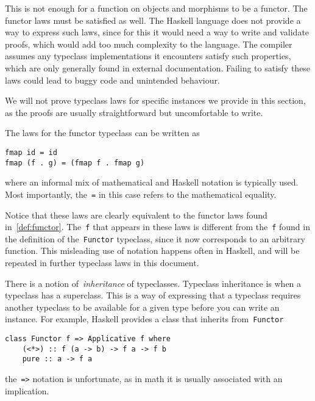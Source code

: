 \documentclass[../TFG.tex]{subfiles}
\begin{document}
This is not enough for a function on objects and morphisms to be a functor. The
functor laws must be satisfied as well. The Haskell language does not provide a
way to express such laws, since for this it would need a way to write and
validate proofs, which would add too much complexity to the language. The
compiler assumes any typeclass implementations it encounters satisfy such
properties, which are only generally found in external documentation. Failing to
satisfy these laws could lead to buggy code and unintended behaviour.

We will not prove typeclass laws for specific instances we provide in this
section, as the proofs are usually straightforward but uncomfortable to write.

The laws for the functor typeclass can be written as
\begin{verbatim}
fmap id = id
fmap (f . g) = (fmap f . fmap g)
\end{verbatim}
where an informal mix of mathematical and Haskell notation is typically used.
Most importantly, the~\texttt{=} in this case refers to the
mathematical equality.

Notice that these laws are clearly equivalent to the functor laws found
in~\ref{def:functor}.  The~\texttt{f} that appears in these laws is
different from the~\texttt{f} found in the definition of
the~\texttt{Functor} typeclass, since it now corresponds to an
arbitrary function. This misleading use of notation happens often in Haskell,
and will be repeated in further typeclass laws in this document.

There is a notion of~\emph{inheritance} of typeclasses. Typeclass inheritance is
when a typeclass has a superclass. This is a way of expressing that a typeclass
requires another typeclass to be available for a given type before you can write
an instance. For example, Haskell provides a class that inherits
from~\texttt{Functor}
\begin{verbatim}
class Functor f => Applicative f where
    (<*>) :: f (a -> b) -> f a -> f b
    pure :: a -> f a
\end{verbatim}
the~\texttt{=>} notation is unfortunate, as in math it is usually
associated with an implication.
\end{document}
